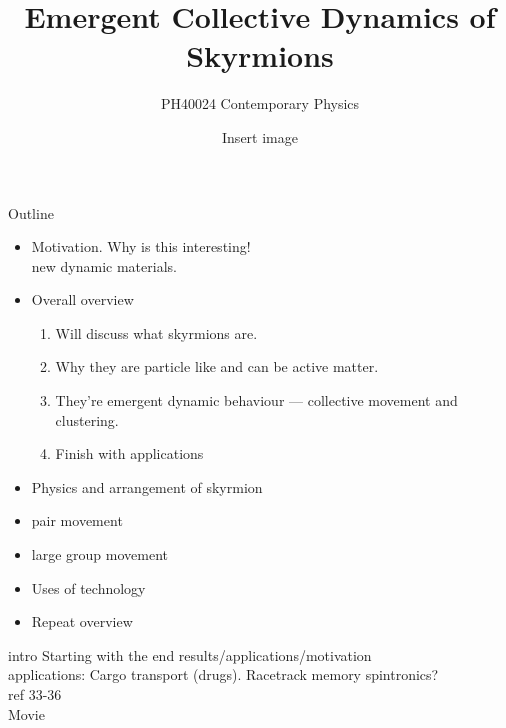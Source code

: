 \documentclass[t, 11pt, xcolor=dvipsnames]{beamer}
\subtitle{PH40024 Contemporary Physics}
\title{Emergent Collective Dynamics of Skyrmions}
\author{ Insert image } %
\date{}
\begin{document}
\begin{frame}[plain]
  \maketitle
{}
\end{frame}
\addtocounter{framenumber}{-1} %

\begin{frame}[plain]{Outline}
  \small
  \begin{itemize}
    \item Motivation. Why is this interesting! \\
      {\tiny new dynamic materials.}
    \item Overall overview \\
    \begin{enumerate}
        \tiny
        \item Will discuss what skyrmions are.  \\
        \item Why they are particle like and can be active matter. \\
        \item They're emergent dynamic behaviour --- collective movement and clustering. \\
        \item Finish with applications \\
            \end{enumerate}
    \item Physics and arrangement of skyrmion \\
    \item pair movement \\
    \item large group movement \\
    \item Uses of technology \\
    \item Repeat overview \\
  \end{itemize}
  \hypertarget<1>{slide1}{}
\end{frame}

\begin{frame}[plain]{intro}
  Starting with the end results/applications/motivation \\
  applications: Cargo transport (drugs). Racetrack memory spintronics? \\
  ref 33-36\\
  Movie \\
\end{frame}
\end{document}
